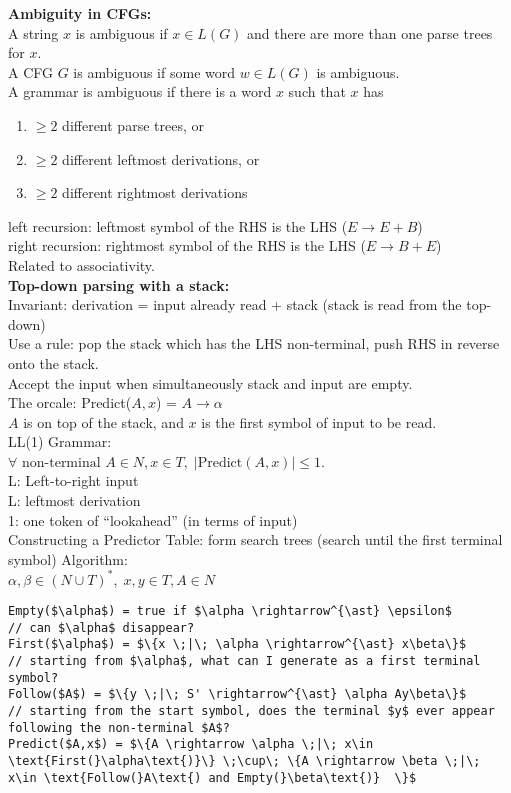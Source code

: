\documentclass[12pt]{article}
\begin{document}
\noindent
\textbf{Ambiguity in CFGs:}\\

\noindent
A string $x$ is ambiguous if $x \in L(G)$ and there are more than one parse trees for $x$.\\
A CFG $G$ is ambiguous if some word $w\in L(G)$ is ambiguous. \\
A grammar is ambiguous if there is a word $x$ such that $x$ has 
\begin{enumerate}
	\item $\geq 2$ different parse trees, or
	\item $\geq 2$ different leftmost derivations, or
	\item $\geq 2$ different rightmost derivations
\end{enumerate}
left recursion: leftmost symbol of the RHS is the LHS ($E \rightarrow E + B$)\\
right recursion: rightmost symbol of the RHS is the LHS ($ E \rightarrow B + E$)\\
Related to associativity.\\

\noindent
\textbf{Top-down parsing with a stack:}\\

\noindent
Invariant: derivation = input already read + stack (stack is read from the top-down)\\
Use a rule: pop the stack which has the LHS non-terminal, push RHS in reverse onto the stack.\\
Accept the input when simultaneously stack and input are empty. \\
The orcale: Predict($A, x$) = $A \rightarrow \alpha$\\
$A$ is on top of the stack, and $x$ is the first symbol of input to be read. \\

\noindent
LL(1) Grammar:\\
$\forall \text{ non-terminal } A \in N, x \in T, \; |\text{Predict}(A, x)| \leq 1$.\\
L: Left-to-right input\\
L: leftmost derivation\\
1: one token of ``lookahead'' (in terms of input)\\

\noindent
Constructing a Predictor Table: form search trees (search until the first terminal symbol)
Algorithm:\\
$\alpha, \beta \in (N \cup T)^{\ast}, \; x, y \in T, A\in N$
\begin{lstlisting}[mathescape=true, showstringspaces=false]
Empty($\alpha$) = true if $\alpha \rightarrow^{\ast} \epsilon$ 
// can $\alpha$ disappear?
First($\alpha$) = $\{x \;|\; \alpha \rightarrow^{\ast} x\beta\}$ 
// starting from $\alpha$, what can I generate as a first terminal symbol? 
Follow($A$) = $\{y \;|\; S' \rightarrow^{\ast} \alpha Ay\beta\}$ 
// starting from the start symbol, does the terminal $y$ ever appear following the non-terminal $A$?
Predict($A,x$) = $\{A \rightarrow \alpha \;|\; x\in \text{First(}\alpha\text{)}\} \;\cup\; \{A \rightarrow \beta \;|\; x\in \text{Follow(}A\text{) and Empty(}\beta\text{)}  \}$
\end{lstlisting}
\end{document}

